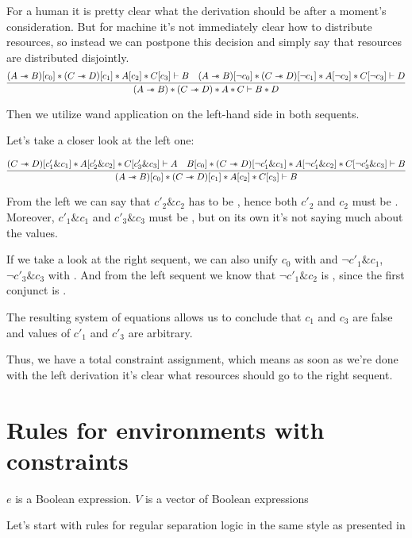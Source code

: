 For a human it is pretty clear what the derivation should be after a moment's consideration.
But for machine it's not immediately clear how to distribute resources, so instead we can postpone this decision and simply say that resources are distributed disjointly.
\[
\infer{(A \wand B) \ast (C \wand D) \ast A \ast C \vdash B \ast D}
      {(A \wand B)[c_0] \ast (C \wand D)[c_1] \ast A[c_2] \ast C[c_3] \vdash B
       &
       (A \wand B)[\neg c_0] \ast (C \wand D)[\neg c_1] \ast A[\neg c_2] \ast C[\neg c_3] \vdash D}
\]

Then we utilize wand application on the left-hand side in both sequents.

Let's take a closer look at the left one:

\[
\infer{(A \wand B)[c_0] \ast (C \wand D)[c_1] \ast
        A[c_2] \ast C[c_3] \vdash B}
      {(C \wand D)[c'_1 \& c_1] \ast
       A[c'_2 \& c_2] \ast C[c'_3 \& c_3] \vdash A
       &
       B[c_0] \ast (C \wand D)[\neg c'_1 \& c_1] \ast
       A[\neg c'_1 \& c_2] \ast C[\neg c'_3 \& c_3] \vdash B}
\]

From the left  we can say that \(c'_2 \& c_2\) has to be \true, hence both \(c'_2\) and \(c_2\) must be \true.
Moreover, \(c'_1 \& c_1\) and \(c'_3 \& c_3\) must be \false, but on its own it's not saying much about the values.

If we take a look at the right sequent, we can also unify \(c_0\) with \true and
\(\neg c'_1 \& c_1\), \(\neg c'_3 \& c_3\) with \false.
And from the left sequent we know that \(\neg c'_1 \& c_2\) is \false, since the first conjunct is \false.

The resulting system of equations allows us to conclude that \(c_1\) and \(c_3\) are false and values of \(c'_1\) and \(c'_3\) are arbitrary.

Thus, we have a total constraint assignment, which means as soon as we're done with the left derivation it's clear what resources should go to the right sequent.

\section{Rules for environments with constraints}

\(e\) is a Boolean expression.
\(V\) is a vector of Boolean expressions

Let's start with rules for regular separation logic in the same style as presented in \citet{harlandResourceDistributionBooleanConstraints2003}

